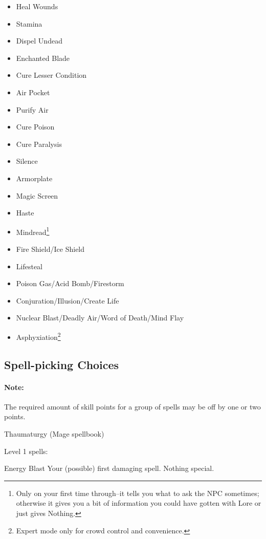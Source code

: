 \documentclass[12pt]{article}
\providecommand{\tightlist}{%
  \setlength{\itemsep}{0pt}\setlength{\parskip}{0pt}}
\let\oldparagraph\paragraph
\renewcommand{\paragraph}[1]{\oldparagraph{#1}\mbox{}}
\begin{document}
\begin{multicols}{2}
\begin{itemize}
\tightlist
\item
  Heal Wounds
\item
  Stamina
\item
  Dispel Undead
\item
  Enchanted Blade
\item
  Cure Lesser Condition
\item
  Air Pocket
\item
  Purify Air
\item
  Cure Poison
\item
  Cure Paralysis
\item
  Silence
\item
  Armorplate
\item
  Magic Screen
\item
  Haste
\item
  Mindread\protect\footnote{Only on your first time through--it tells you
    what to ask the NPC sometimes; otherwise it gives you a bit of
    information you could have gotten with Lore or just gives Nothing.}
\item
  Fire Shield/Ice Shield
\item
  Lifesteal
\item
  Poison Gas/Acid Bomb/Firestorm
\item
  Conjuration/Illusion/Create Life
\item
  Nuclear Blast/Deadly Air/Word of Death/Mind Flay
\item
  Asphyxiation\protect\footnote{Expert mode only for crowd control and
    convenience.}
\end{itemize}
\end{multicols}

\subsection{Spell-picking Choices}\label{spell-picking-choices}

\paragraph{Note:} The required amount of skill points for a group of spells
may be off by one or two points.

Thaumaturgy (Mage spellbook)

Level 1 spells:

Energy Blast Your (possible) first damaging spell. Nothing special.
\end{document}

